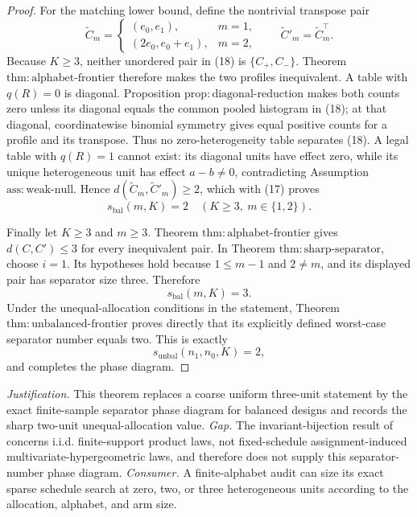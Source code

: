 \documentclass{article}
\begin{document}
\begin{proof}
For the matching lower bound, define the nontrivial transpose pair
\[
\widetilde C_m=
\begin{cases}
(e_0,e_1),&m=1,\\
(2e_0,e_0+e_1),&m=2,
\end{cases}
\qquad
\widetilde C'_m=\widetilde C_m^\top. \tag{18}
\]
Because \(K\geq3\), neither unordered pair in (18) is \(\{C_+,C_-\}\). Theorem \(\mathrm{thm{:}alphabet\text{-}frontier}\) therefore makes the two profiles inequivalent. A table with \(q(R)=0\) is diagonal. Proposition \(\mathrm{prop{:}diagonal\text{-}reduction}\) makes both counts zero unless its diagonal equals the common pooled histogram in (18); at that diagonal, coordinatewise binomial symmetry gives equal positive counts for a profile and its transpose. Thus no zero-heterogeneity table separates (18). A legal table with \(q(R)=1\) cannot exist: its diagonal units have effect zero, while its unique heterogeneous unit has effect \(a-b\neq0\), contradicting Assumption \(\mathrm{ass{:}weak\text{-}null}\). Hence \(d(\widetilde C_m,\widetilde C'_m)\geq2\), which with (17) proves
\[
s_{\mathrm{bal}}(m,K)=2
\quad(K\geq3,\ m\in\{1,2\}). \tag{19}
\]

Finally let \(K\geq3\) and \(m\geq3\). Theorem \(\mathrm{thm{:}alphabet\text{-}frontier}\) gives \(d(C,C')\leq3\) for every inequivalent pair. In Theorem \(\mathrm{thm{:}sharp\text{-}separator}\), choose \(i=1\). Its hypotheses hold because \(1\leq m-1\) and \(2\neq m\), and its displayed pair has separator size three. Therefore
\[
s_{\mathrm{bal}}(m,K)=3. \tag{20}
\]
Under the unequal-allocation conditions in the statement, Theorem \(\mathrm{thm{:}unbalanced\text{-}frontier}\) proves directly that its explicitly defined worst-case separator number equals two. This is exactly
\[
s_{\mathrm{unbal}}(n_1,n_0,K)=2, \tag{21}
\]
and completes the phase diagram.
\end{proof}
\par\smallskip\noindent \textit{Justification.} This theorem replaces a coarse uniform three-unit statement by the exact finite-sample separator phase diagram for balanced designs and records the sharp two-unit unequal-allocation value. \textit{Gap.} The invariant-bijection result of \cite{DutzZhang2026} concerns i.i.d. finite-support product laws, not fixed-schedule assignment-induced multivariate-hypergeometric laws, and therefore does not supply this separator-number phase diagram. \textit{Consumer.} A finite-alphabet audit can size its exact sparse schedule search at zero, two, or three heterogeneous units according to the allocation, alphabet, and arm size.
\end{document}
